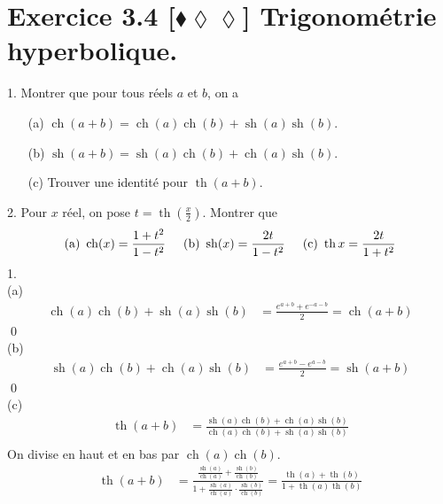 \documentclass[10pt]{article}
\DeclareMathOperator{\ch}{ch}
\DeclareMathOperator{\sh}{sh}
\DeclareMathOperator{\tah}{th}
\begin{document}
\section*{Exercice 3.4 [$\blacklozenge\lozenge\lozenge$] Trigonométrie hyperbolique.}
\begin{tcolorbox}[enhanced, width=7in, center, size=fbox, fontupper=\large, drop shadow southwest]
    1. Montrer que pour tous réels $a$ et $b$, on a
    \begin{itemize}
        \item[(a)] $\ch(a+b)=\ch(a)\ch(b)+\sh(a)\sh(b)$.
        \item[(b)] $\sh(a+b)=\sh(a)\ch(b)+\ch(a)\sh(b)$.
        \item[(c)] Trouver une identité pour $\tah(a+b)$.
    \end{itemize}
    2. Pour $x$ réel, on pose $t=\tah\left(\frac{x}{2}\right)$. Montrer que
    \begin{equation*}
        \text{(a) } \ch(x)=\frac{1+t^2}{1-t^2} \hspace{0.5cm} \text{(b) } \sh(x)=\frac{2t}{1-t^2} \hspace{0.5cm} \text{(c) } \tah{x}=\frac{2t}{1+t^2}
    \end{equation*}
    1.\\
    (a)
    \begin{align*}
        \ch(a)\ch(b)+\sh(a)\sh(b)&=\frac{e^{a+b}+e^{-a-b}}{2}=\ch(a+b)
    \end{align*}
    \qed\\
    (b)
    \begin{align*}
        \sh(a)\ch(b)+\ch(a)\sh(b)&=\frac{e^{a+b}-e^{a-b}}{2}=\sh(a+b)
    \end{align*}
    \qed\\
    (c)
    \begin{align*}
        \tah(a+b)&=\frac{\sh(a)\ch(b)+\ch(a)\sh(b)}{\ch(a)\ch(b)+\sh(a)\sh(b)}\\
    \end{align*}
    On divise en haut et en bas par $\ch(a)\ch(b)$.
    \begin{align*}
        \tah(a+b)&=\frac{\frac{\sh(a)}{\ch(a)}+\frac{\sh(b)}{\ch(b)}}{1+\frac{\sh(a)}{\ch(a)}\cdot\frac{\sh(b)}{\ch(b)}}=\frac{\tah(a)+\tah(b)}{1+\tah(a)\tah(b)}
    \end{align*}
\end{tcolorbox}
\end{document}
